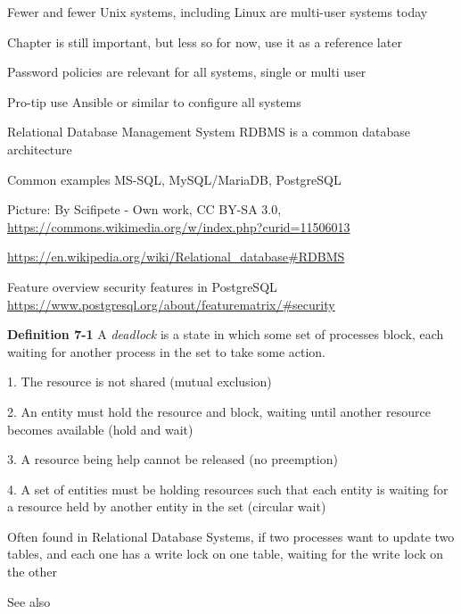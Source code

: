 \documentclass[Screen16to9,17pt]{foils}
\begin{document}

\begin{list2}
\item Fewer and fewer Unix systems, including Linux are multi-user systems today
\item Chapter is still important, but less so for now, use it as a reference later
\item Password policies are relevant for all systems, single or multi user
\item Pro-tip use Ansible or similar to configure all systems
\end{list2}



\begin{list1}
\item Relational Database Management System RDBMS is a common database architecture
\item Common examples MS-SQL, MySQL/MariaDB, PostgreSQL
\item Picture: By Scifipete - Own work, CC BY-SA 3.0,\\ \url{https://commons.wikimedia.org/w/index.php?curid=11506013}
\item \url{https://en.wikipedia.org/wiki/Relational_database#RDBMS}
\end{list1}


Feature overview security features in PostgreSQL\\
\url{https://www.postgresql.org/about/featurematrix/#security}


\begin{list1}
\item {\bf Definition 7-1} A \emph{deadlock} is a state in which some set of processes block, each waiting for another process in the set to take some action.
\begin{list2}
\item[1.] The resource is not shared (mutual exclusion)
\item[2.] An entity must hold the resource and block, waiting until another resource becomes available (hold and wait)
\item[3.] A resource being help cannot be released (no preemption)
\item[4.] A set of entities must be holding resources such that each entity is waiting for a resource held by another entity in the set (circular wait)
\end{list2}
\item Often found in Relational Database Systems, if two processes want to update two tables, and each one has a write lock on one table, waiting for the write lock on the other
\item See also 
\end{list1}
\end{document}
